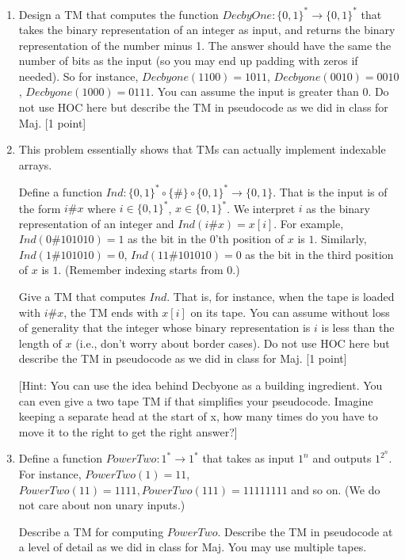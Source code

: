 \documentclass[11pt]{article}
\begin{document}
\begin{enumerate}
\item Design a TM that computes the function $DecbyOne:\{0,1\}^* \rightarrow \{0,1\}^*$ that takes the binary representation of an integer as input, and returns the binary representation of the number minus 1. The answer should have the same the number of bits as the input (so you may end up padding with zeros if needed). So for instance, $Decbyone(1100) = 1011$, $Decbyone(0010) = 0010$, $Decbyone(1000) = 0111$. You can assume the input is greater than $0$. Do not use HOC here but describe the TM in pseudocode as we did in class for Maj. [1 point]

\item This problem essentially shows that TMs can actually implement indexable arrays. 

Define a function $Ind:\{0,1\}^*\circ \{\#\}\circ \{0,1\}^* \rightarrow \{0,1\}$. That is the input is of the form $i\#x$ where $i \in \{0,1\}^*$, $x \in \{0,1\}^*$. We interpret $i$ as the binary representation of an integer and $Ind(i\#x) = x[i]$. For example, $Ind(0\#101010) = 1$ as the bit in the $0$'th position of $x$ is $1$. Similarly, $Ind(1\#101010) = 0$, $Ind(11\#101010) = 0$ as the bit in the third position of $x$ is $1$. (Remember indexing starts from $0$.)

Give a TM that computes $Ind$. That is, for instance, when the tape is loaded with $i\#x$, the TM ends with $x[i]$ on its tape. You can assume without loss of generality that the integer whose binary representation is $i$ is less than the length of $x$ (i.e., don't worry about border cases). Do not use HOC here but describe the TM in pseudocode as we did in class for Maj. [1 point]

[Hint: You can use the idea behind Decbyone as a building ingredient. You can even give a two tape TM if that simplifies your pseudocode. Imagine keeping a separate head at the start of x, how many times do you have to move it to the right to get the right answer?]

\item Define a function $PowerTwo:1^* \rightarrow 1^*$ that takes as input $1^n$ and outputs $1^{2^n}$. For instance, $PowerTwo(1) = 11$, $PowerTwo(11) = 1111, PowerTwo(111) = 11111111$ and so on. (We do not care about non unary inputs.)

Describe a TM for computing $PowerTwo$. Describe the TM in pseudocode at a level of detail as we did in class for Maj. You may use multiple tapes. 


\end{enumerate}
\end{document}
